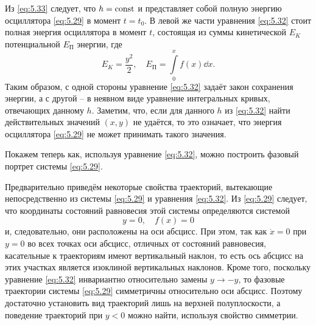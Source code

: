 Из \eqref{eq:5.33} следует, что $h = \textrm{const}$ и представляет собой полную энергию осциллятора \eqref{eq:5.29} в момент $t= t_0$. В левой же части уравнения \eqref{eq:5.32} стоит полная энергия осциллятора в момент $t$, состоящая из суммы
кинетической $E_K$  потенциальной $E_{\text{П}}$ энергии, где
\begin{equation}
        \label{eq:5.34}
        E_K = \frac{y^2}{2}, \quad E_{\text{П}} = \int\limits_{0}^{x} f(x) \dd{x}. 
\end{equation}
Таким образом, с одной стороны уравнение \eqref{eq:5.32} задаёт закон сохранения энергии, а с другой -- в неявном виде уравнение интегральных кривых, отвечающих данному $h$. Заметим, что, если для данного $h$ из \eqref{eq:5.32} найти действительных значений $(x,y)$ не удаётся, то это означает, что энергия осциллятора \eqref{eq:5.29} не может принимать такого значения.

Покажем теперь как, используя уравнение \eqref{eq:5.32}, можно построить фазовый портрет системы \eqref{eq:5.29}.

Предварительно приведём некоторые свойства траекторий, вытекающие непосредственно из системы \eqref{eq:5.29} и уравнения \eqref{eq:5.32}. Из \eqref{eq:5.29} следует, что координаты состояний равновесия этой системы определяются системой
\begin{equation}
        \label{eq:5.35}
        y=0, \quad f(x)=0
\end{equation}
и, следовательно, они расположены на оси абсцисс. При этом, так как $\dot x = 0$ при $y=0$ во всех точках оси абсцисс, отличных от состояний равновесия, касательные к траекториям имеют вертикальный наклон, то есть ось абсцисс на этих участках является изоклиной вертикальных наклонов. Кроме того, поскольку уравнение \eqref{eq:5.32} инвариантно относительно замены $y \to -y$, то фазовые траектории системы \eqref{eq:5.29} симметричны относительно оси абсцисс. 
Поэтому достаточно установить вид траекторий лишь на верхней полуплоскости, а поведение траекторий при $y<0$
 можно найти, используя свойство симметрии.

